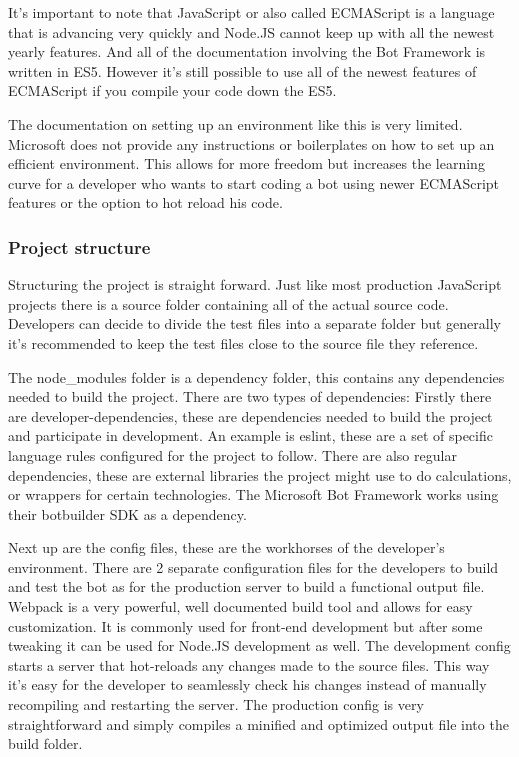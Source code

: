 It's important to note that JavaScript or also called \Gls{ECMAScript} is a language that is advancing very quickly and Node.JS cannot keep up with all the newest yearly features. And all of the documentation involving the Bot Framework is written in \Gls{ES5}. However it's still possible to use all of the newest features of ECMAScript if you compile your code down the ES5.

The documentation on setting up an environment like this is very limited. Microsoft does not provide any instructions or boilerplates on how to set up an efficient environment. This allows for more freedom but increases the learning curve for a developer who wants to start coding a bot using newer ECMAScript features or the option to hot reload his code.

\subsubsection{Project structure}

Structuring the project is straight forward. Just like most production JavaScript projects there is a source folder containing all of the actual source code. Developers can decide to divide the test files into a separate folder but generally it's recommended to keep the test files close to the source file they reference.

The node\_modules folder is a dependency folder, this contains any dependencies needed to build the project. There are two types of dependencies: Firstly there are developer-dependencies, these are dependencies needed to build the project and participate in development. An example is eslint, these are a set of specific language rules configured for the project to follow. There are also regular dependencies, these are external libraries the project might use to do calculations, or wrappers for certain technologies. The Microsoft Bot Framework works using their botbuilder \Gls{SDK} as a dependency.

Next up are the config files, these are the workhorses of the developer's environment. There are 2 separate configuration files for the developers to build and test the bot as for the production server to build a functional output file. Webpack is a very powerful, well documented build tool and allows for easy customization. It is commonly used for front-end development but after some tweaking it can be used for Node.JS development as well. The development config starts a server that hot-reloads any changes made to the source files. This way it's easy for the developer to seamlessly check his changes instead of manually recompiling and restarting the server. The production config is very straightforward and simply compiles a minified and optimized output file into the build folder.

